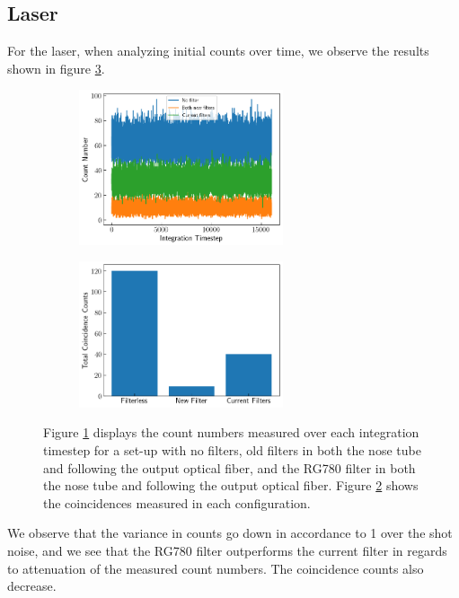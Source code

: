 \documentclass[letterpaper, 11 pt]{article}
\begin{document}
\subsection{Laser}
For the laser, when analyzing initial counts over time, we observe the results
shown in figure \ref{fig:filter_run}.
\begin{figure}[H]%
    \centering
    \begin{subfigure}{.4\textwidth}
    \includegraphics[width=6cm]{filter_ch1_laser.png}
    \caption{ }
    \label{fig:lch1}
    \end{subfigure}
    \begin{subfigure}{.4\textwidth}
    \includegraphics[width = 6cm]{filter_cc_laser.png}
    \caption{ }
    \label{fig:lcc}
    \end{subfigure}
    \caption{Figure \ref{fig:lch1} displays the count numbers measured over each
    integration timestep for a set-up with no filters, old filters in both the
    nose tube and following the output optical fiber, and the RG780 filter in
    both the nose tube and following the output optical fiber. Figure
    \ref{fig:lcc} shows the coincidences measured in each configuration.}
    \label{fig:filter_run}
\end{figure}
We observe that the variance in counts go down in accordance to 1 over the shot
noise, and we see that the RG780 filter outperforms the current filter in
regards to attenuation of the measured count numbers. The coincidence counts
also decrease.
\end{document}
